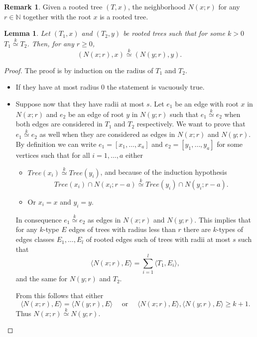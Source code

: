 \documentclass[11pt,notitlepage]{report}
\newtheorem{lemma}{Lemma}[chapter]
\theoremstyle{definition}
\newtheorem{remark}{Remark}[chapter]
\newcommand{\N}{\mathbb{N}}
\newcommand{\morph}[1]{\stackrel{#1}{\simeq}}
\begin{document}
\begin{remark}
	Given a rooted tree $(T,x)$, the neighborhood $N(x;r)$ for any $r\in \N$
	together with the root $x$ is a rooted tree.
\end{remark}


\begin{lemma}\label{lem:radiustree}
	Let $(T_1,x)$ and $(T_2,y)$ be rooted trees such that for some $k>0$ 
	$T_1 \morph{k} T_2$. Then, for any $r\geq 0$, 
	\[(N(x;r),x)\morph{k} (N(y;r),y).\]
\end{lemma}
\begin{proof}
	The proof is by induction on the radius of $T_1$ and $T_2$.
	\begin{itemize}[leftmargin=*]
		\item If they have at most radius $0$ the statement is vacuously true. 
		\item Suppose now that they have radii at most $s$. Let $e_1$ be an edge with root
		$x$ in $N(x;r)$ and $e_2$ be an edge of root $y$ in $N(y;r)$ such that $e_1 \morph{k} e_2$
		when both edges are considered in $T_1$ and $T_2$ respectively. We want to prove that
		$e_1 \morph{k} e_2$ as well when they are considered as edges in $N(x;r)$ and $N(y;r)$.
		By definition we can write $e_1=[x_1,\dots,x_a]$ and 
		$e_2=[y_1,\dots,y_a]$ for some vertices such that for all
		$i=1,\dots, a$ either 
		\begin{itemize}
			\item $Tree(x_i)\morph{k} Tree(y_i)$, and because of the induction hypothesis 
			\[Tree(x_i)\cap N(x_i;r-a) \morph{k} Tree(y_i)\cap N(y_i;r-a).\] 
			\item Or $x_i=x$ and $y_i=y$.
		\end{itemize}
		In consequence $e_1 \morph{k} e_2$ as edges in $N(x;r)$ and $N(y;r)$. 
		This implies that for any $k$-type $E$ edges of trees with
		radius less than $r$ there are $k$-types of edges classes 
		$E_1,\dots,E_l$ of rooted edges such
		of trees with radii at most $s$ such that
		\[ \langle N(x;r),E \rangle =  \sum_{i=1}^{l}\langle T_1, E_i\rangle ,\]
		and the same for $N(y;r)$ and $T_2$.\par
		From this follows that either
		\[ \langle N(x;r),E \rangle =\langle N(y;r),E \rangle \quad
		\text{ or } \quad  
		\langle N(x;r),E \rangle,
		\langle N(y;r),E \rangle \geq k+1. \]
		Thus $N(x;r)\morph{k} N(y;r)$.
	\end{itemize}	
\end{proof}
\end{document}
